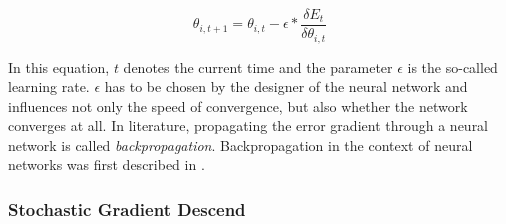 \[
	\theta_{i, t+1} = \theta_{i, t} - \epsilon * \frac{\delta E_{t}}{\delta \theta_{i, t}}
\]

In this equation, $t$ denotes the current time and the parameter $\epsilon$ is the so-called learning rate. $\epsilon$ has to be chosen by the designer of the neural network and influences not only the speed of convergence, but also whether the network converges at all. In literature, propagating the error gradient through a neural network is called \textit{backpropagation}. Backpropagation in the context of neural networks was first described in \cite{werbos1974beyond}.

\subsubsection{Stochastic Gradient Descend}

